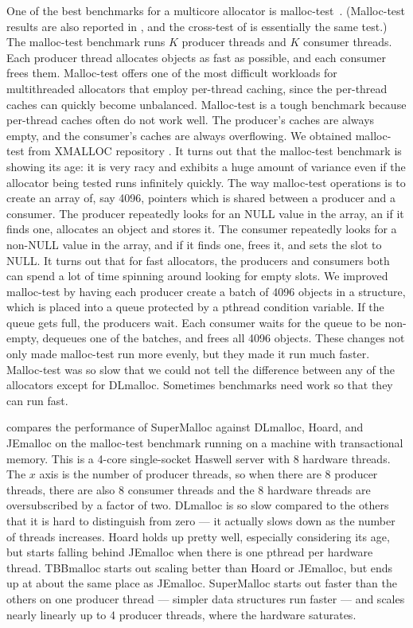 \documentclass[pldi]{sigplanconf-pldi15}
\begin{document}
One of the best benchmarks for a multicore allocator is
malloc-test~\cite{LeverBo00}.  (Malloc-test results are also reported
in \cite{Evans06}, and the cross-test of \cite{KukanovVo07} is
essentially the same test.)  The malloc-test benchmark runs $K$
producer threads and $K$ consumer threads.  Each producer thread
allocates objects as fast as possible, and each consumer frees them.
Malloc-test offers one of the most difficult workloads for
multithreaded allocators that employ per-thread caching, since the
per-thread caches can quickly become unbalanced.  Malloc-test is a
tough benchmark because per-thread caches often do not work well.  The
producer's caches are always empty, and the consumer's caches are
always overflowing.  We obtained malloc-test from XMALLOC repository
\cite{EderSc12}.  It turns out that the malloc-test benchmark is
showing its age: it is very racy and exhibits a huge amount of
variance even if the allocator being tested runs infinitely quickly.
The way malloc-test operations is to create an array of, say 4096,
pointers which is shared between a producer and a consumer.  The
producer repeatedly looks for an NULL value in the array, an if it
finds one, allocates an object and stores it.  The consumer repeatedly
looks for a non-NULL value in the array, and if it finds one, frees
it, and sets the slot to NULL\@.  It turns out that for fast
allocators, the producers and consumers both can spend a lot of time
spinning around looking for empty slots.  We improved malloc-test by
having each producer create a batch of 4096 objects in a structure,
which is placed into a queue protected by a pthread condition
variable.  If the queue gets full, the producers wait.  Each consumer
waits for the queue to be non-empty, dequeues one of the batches, and
frees all 4096 objects.  These changes not only made malloc-test run
more evenly, but they made it run much faster.  Malloc-test was so
slow that we could not tell the difference between any of the
allocators except for DLmalloc.  Sometimes benchmarks need work so
that they can run fast.

 compares the performance of SuperMalloc against
DLmalloc, Hoard, and JEmalloc on the malloc-test benchmark running on
a machine with transactional memory.  This is a 4-core single-socket
Haswell server with 8 hardware threads.  The $x$ axis is the number of
producer threads, so when there are $8$ producer threads, there are
also $8$ consumer threads and the 8 hardware threads are
oversubscribed by a factor of two.  DLmalloc is so slow compared to
the others that it is hard to distinguish from zero --- it actually
slows down as the number of threads increases.  Hoard holds up pretty
well, especially considering its age, but starts falling behind
JEmalloc when there is one pthread per hardware thread.  TBBmalloc
starts out scaling better than Hoard or JEmalloc, but ends up at about
the same place as JEmalloc.  SuperMalloc starts out faster than the
others on one producer thread --- simpler data structures run faster
--- and scales nearly linearly up to 4 producer threads, where the
hardware saturates.
\end{document}
